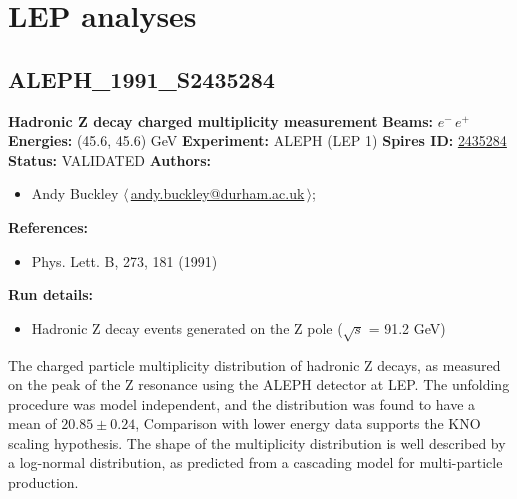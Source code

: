 \makeatletter
\renewcommand{\d}[1]{\ensuremath{\mathrm{#1}}}
\let\old@eta\eta
\renewcommand{\eta}{\ensuremath{\old@eta}\xspace}
\let\old@phi\phi
\renewcommand{\phi}{\ensuremath{\old@phi}\xspace}
\providecommand{\pT}{\ensuremath{p_\perp}\xspace}
\providecommand{\pTmin}{\ensuremath{p_\perp^\text{min}}\xspace}
\makeatother

\section{LEP analyses}\subsection[ALEPH\_1991\_S2435284]{ALEPH\_1991\_S2435284\,\cite{Decamp:1991uz}}
\textbf{Hadronic Z decay charged multiplicity measurement}\newline
\textbf{Beams:} $e^-$\,$e^+$ \newline
\textbf{Energies:} (45.6, 45.6) GeV \newline
\textbf{Experiment:} ALEPH (LEP 1) \newline
\textbf{Spires ID:} \href{http://www.slac.stanford.edu/spires/find/hep/www?rawcmd=key+2435284}{2435284}\newline
\textbf{Status:} VALIDATED\newline
\textbf{Authors:}
\begin{itemize}
  \item Andy Buckley $\langle\,$\href{mailto:andy.buckley@durham.ac.uk}{andy.buckley@durham.ac.uk}$\,\rangle$;
\end{itemize}
\textbf{References:}
\begin{itemize}
  \item Phys. Lett. B, 273, 181 (1991)
\end{itemize}
\textbf{Run details:}
\begin{itemize}

  \item Hadronic Z decay events generated on the Z pole (\ensuremath{\sqrt{s}} = 91.2 GeV)\end{itemize}

\noindent The charged particle multiplicity distribution of hadronic Z decays, as measured on the peak of the Z resonance using the ALEPH detector at LEP. The unfolding procedure was model independent, and the distribution was found to have a mean of $20.85 \pm 0.24$, Comparison with lower energy data supports the KNO scaling hypothesis. The shape of the multiplicity distribution is well described by a log-normal distribution, as predicted from a cascading model for multi-particle production.

